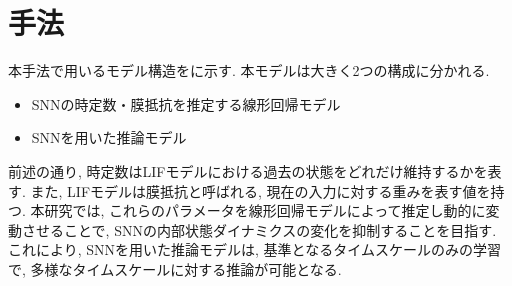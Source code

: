 \section{手法}

本手法で用いるモデル構造をに示す.
本モデルは大きく2つの構成に分かれる.
\begin{itemize}
    \item SNNの時定数・膜抵抗を推定する線形回帰モデル
    \item SNNを用いた推論モデル
\end{itemize}
前述の通り, 時定数はLIFモデルにおける過去の状態をどれだけ維持するかを表す.
また, LIFモデルは膜抵抗と呼ばれる, 現在の入力に対する重みを表す値を持つ.
本研究では, これらのパラメータを線形回帰モデルによって推定し動的に変動させることで, SNNの内部状態ダイナミクスの変化を抑制することを目指す.
これにより, SNNを用いた推論モデルは, 基準となるタイムスケールのみの学習で, 多様なタイムスケールに対する推論が可能となる.




